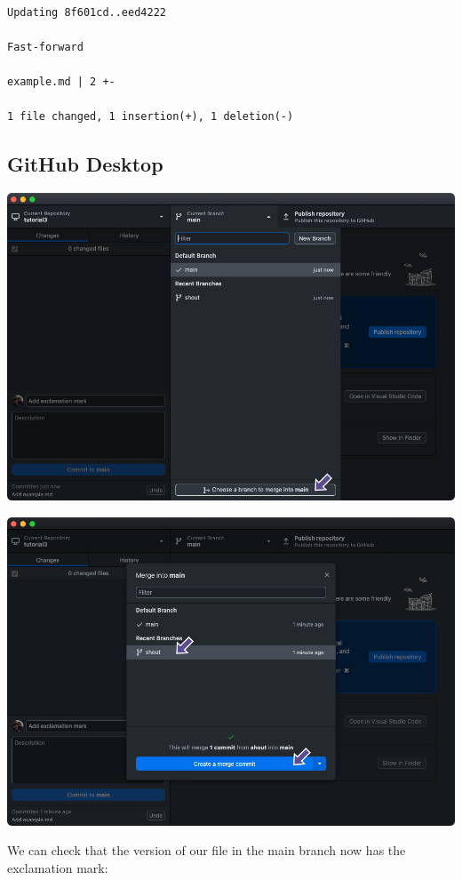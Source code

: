 \documentclass[
  letterpaper,
  DIV=11,
  numbers=noendperiod]{scrartcl}
\begin{document}
\begin{verbatim}

Updating 8f601cd..eed4222

Fast-forward

example.md | 2 +-

1 file changed, 1 insertion(+), 1 deletion(-)
\end{verbatim}

\subsection{GitHub Desktop}

\includegraphics{images/image33.png}

\includegraphics{images/image34.png}

We can check that the version of our file in the main branch now has the
exclamation mark:
\end{document}
